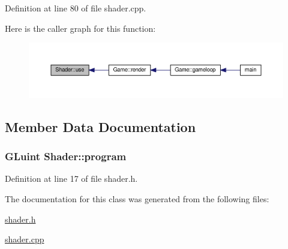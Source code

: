 Definition at line 80 of file shader.\+cpp.



Here is the caller graph for this function\+:\nopagebreak
\begin{figure}[H]
\begin{center}
\leavevmode
\includegraphics[width=350pt]{class_shader_a870fa9f13d69e558815d6fd351a469dc_icgraph}
\end{center}
\end{figure}




\subsection{Member Data Documentation}
\hypertarget{class_shader_af036f983d35fe0f8f31dedc009b3645e}{}
\subsubsection[{program}]{\setlength{\rightskip}{0pt plus 5cm}G\+Luint Shader\+::program}\label{class_shader_af036f983d35fe0f8f31dedc009b3645e}


Definition at line 17 of file shader.\+h.



The documentation for this class was generated from the following files\+:\begin{DoxyCompactItemize}
\item 
\hyperlink{shader_8h}{shader.\+h}\item 
\hyperlink{shader_8cpp}{shader.\+cpp}\end{DoxyCompactItemize}
